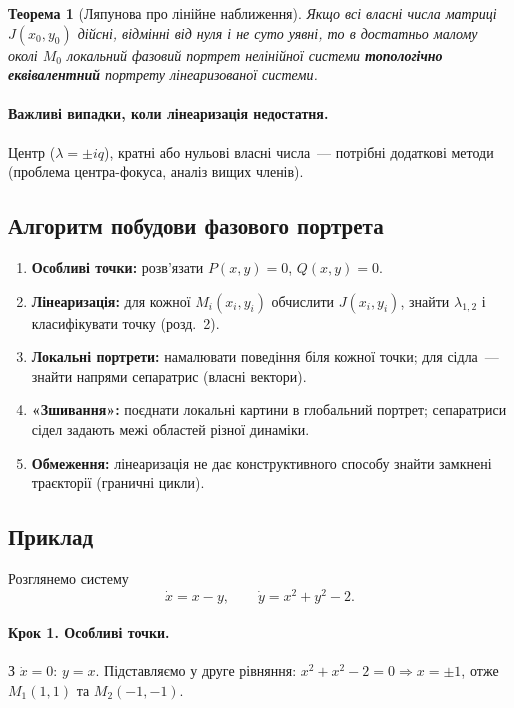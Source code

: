 \documentclass[12pt,a4paper]{article}
\theoremstyle{definition}
\theoremstyle{plain}
\newtheorem*{teorema*}{Теорема}
\begin{document}
\begin{teorema*}[Ляпунова про лінійне наближення]
Якщо всі власні числа матриці $J(x_0,y_0)$ \emph{дійсні, відмінні від нуля}
і \emph{не суто уявні}, то в достатньо малому околі $M_0$ локальний фазовий
портрет нелінійної системи \textbf{топологічно еквівалентний} портрету
лінеаризованої системи.
\end{teorema*}

\paragraph{Важливі випадки, коли лінеаризація недостатня.}
Центр ($\lambda=\pm iq$), кратні або нульові власні числа~--- потрібні
додаткові методи (проблема центра-фокуса, аналіз вищих членів).

\subsection{Алгоритм побудови фазового портрета}

\begin{enumerate}[leftmargin=1.8em]
  \item \textbf{Особливі точки:} розв'язати $P(x,y)=0$, $Q(x,y)=0$.
  \item \textbf{Лінеаризація:} для кожної $M_i(x_i,y_i)$ обчислити $J(x_i,y_i)$,
        знайти $\lambda_{1,2}$ і класифікувати точку (розд.~2).
  \item \textbf{Локальні портрети:} намалювати поведіння біля кожної точки;
        для сідла~--- знайти напрями сепаратрис (власні вектори).
  \item \textbf{«Зшивання»:} поєднати локальні картини в глобальний портрет;
        сепаратриси сідел задають межі областей різної динаміки.
  \item \textbf{Обмеження:} лінеаризація не дає конструктивного способу
        знайти замкнені траєкторії (граничні цикли).
\end{enumerate}

\subsection{Приклад}

Розглянемо систему
\begin{equation}
  \dot x = x - y, \qquad \dot y = x^2 + y^2 - 2.
  \label{eq:example-nonlinear}
\end{equation}

\paragraph{Крок 1. Особливі точки.}
З $\dot x=0$: $y=x$. Підставляємо у друге рівняння:
$x^2+x^2-2=0 \Rightarrow x=\pm1$, отже
$M_1(1,1)$ та $M_2(-1,-1)$.
\end{document}
